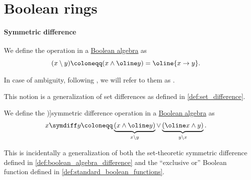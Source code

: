 \section{Boolean rings}\label{sec:boolean_rings}

\paragraph{Symmetric difference}

\begin{definition}\label{def:boolean_algebra_difference}
  We define the  operation in a \hyperref[def:boolean_algebra]{Boolean algebra} as
  \begin{equation}\label{eq:def:boolean_algebra_difference}
    (x \setminus y) \coloneqq (x \wedge \oline y) = \oline{x \rightarrow y}.
  \end{equation}

  In case of ambiguity, following \textcite[20]{Halmos1976MeasureTheory}, we will refer to them as .
\end{definition}
\begin{comments}
  \item This notion is a generalization of set differences as defined in \cref{def:set_difference}.
\end{comments}

\begin{definition}\label{def:symmetric_difference}
  We define the \term[ru=симметрическая разность (\cite[\S 2.1.5]{КусраевКутателадзе2005БулевозначныйАнализ})]{symmetric difference} operation in a \hyperref[def:boolean_algebra]{Boolean algebra} as
  \begin{equation}\label{eq:def:symmetric_difference}
    x \symdiff y \coloneqq \underbrace{(x \wedge \oline y)}_{x \setminus y} \vee \underbrace{(\oline x \wedge y)}_{y \setminus x}.
  \end{equation}
\end{definition}
\begin{comments}
  \item This is incidentally a generalization of both the set-theoretic symmetric difference defined in \cref{def:boolean_algebra_difference} and the \enquote{exclusive or} Boolean function defined in \cref{def:standard_boolean_functions}.
\end{comments}

